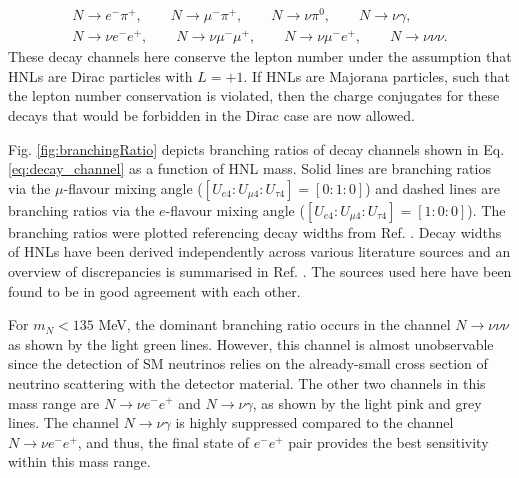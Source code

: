 \begin{equation}
\begin{split}
\label{eq:decay_channel}
	N\rightarrow e^{-}\pi^{+},\qquad 
	N\rightarrow \mu^{-}\pi^{+},\qquad
	N\rightarrow \nu \pi^{0},\qquad 
	N\rightarrow \nu \gamma,\qquad \\ 
	N\rightarrow \nu e^{-} e^{+},\qquad 
	N\rightarrow \nu \mu^{-} \mu^{+},\qquad 
	N\rightarrow \nu \mu^{-}e^{+},\qquad
	N\rightarrow \nu \nu \nu.   
\end{split}
\end{equation}
These decay channels here conserve the lepton number under the assumption that HNLs are Dirac particles with $L=+1$.
If HNLs are Majorana particles, such that the lepton number conservation is violated, then the charge conjugates for these decays that would be forbidden in the Dirac case are now allowed.


Fig. \ref{fig:branchingRatio} depicts branching ratios of decay channels shown in Eq. \ref{eq:decay_channel} as a function of HNL mass.
Solid lines are branching ratios via the $\mu$-flavour mixing angle ($[U_{e4}:U_{\mu4}:U_{\tau4}]=[0:1:0]$) and dashed lines are branching ratios via the $e$-flavour mixing angle ($[U_{e4}:U_{\mu4}:U_{\tau4}]=[1:0:0]$).
The branching ratios were plotted referencing decay widths from Ref. \cite {HNLBin, SBNHNL, HNLZarko}.
Decay widths of HNLs have been derived independently across various literature sources and an overview of discrepancies is summarised in Ref. \cite{HNLZarko}. 
The sources used here have been found to be in good agreement with each other.

For $m_{N} < 135$ MeV, the dominant branching ratio occurs in the channel $N\rightarrow \nu\nu\nu$ as shown by the light green lines.
However, this channel is almost unobservable since the detection of SM neutrinos relies on the already-small cross section of neutrino scattering with the detector material.
The other two channels in this mass range are $N\rightarrow \nu e^{-}e^{+}$ and $N\rightarrow \nu \gamma$, as shown by the light pink and grey lines.
The channel $N\rightarrow \nu \gamma$ is highly suppressed compared to the channel $N\rightarrow \nu e^{-}e^{+}$, and thus, the final state of $e^-e^+$ pair provides the best sensitivity within this mass range.

